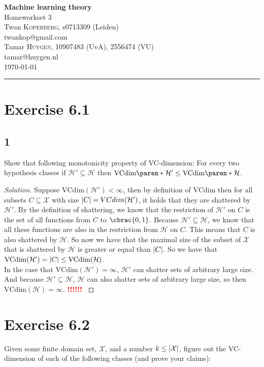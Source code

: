 \documentclass[10pt, a4paper, twoside]{amsart}
\makeatletter
\DeclarePairedDelimiter\abs{\lvert}{\rvert}
\DeclarePairedDelimiter\cbrac\{\}
\DeclarePairedDelimiter\paren()
\newcommand{\cH}{\ensuremath{\mathcal{H}}}
\newcommand{\cX}{\ensuremath{\mathcal{X}}}
\newenvironment{solution}
               {\let\oldqedsymbol=\qedsymbol
                \renewcommand{\qedsymbol}{$\blacktriangleleft$}
                \begin{proof}[Solution]}
               {\end{proof}
                \renewcommand{\qedsymbol}{\oldqedsymbol}}
\newcommand{\TODO}{\textcolor{red}{\textbf{!!!!!! }}}
\newcommand{\firstName}  {Twan}
\newcommand{\lastName}   {Koperberg}
\newcommand{\studId}     {0713309 (Leiden)}
\renewcommand{\email}    {twankop@gmail.com}
\newcommand{\firstNameII}  {Tamar}
\newcommand{\lastNameII}   {Huygen}
\newcommand{\studIdII}     {10907483 (UvA)}
\newcommand{\studIdIII}    {2556474 (VU)}
\newcommand{\emailII}     {tamar@huygen.nl}
\makeatother
\begin{document}
\begin{center}

  {\huge\bf Machine learning theory}\\
  {\large\sc Homeworkset 3 }\\ \vspace{1em}
  \firstName \textsc{ \lastName}, {\sc s}\studId \\
  \email\text{}\\ \smallskip
  \firstNameII \textsc{ \lastNameII}, \studIdII, \studIdIII\\
  \emailII \\ \bigskip
  \today \\\bigskip
  \hrule
  \bigskip
 \end{center}

\section*{Exercise 6.1}
\subsection*{1}
Show that following monotonicity property of VC-dimension: For every two hypothesis classes if $\cH' \subseteq \cH$ then $\text{VCdim}\paren*{\cH'}\leq \text{VCdim}\paren*{\cH}$.
\begin{solution}
  Suppose $\text{VCdim}(\cH') < \infty$, then by definition of $\text{VCdim}$ then for all subsets $C \subseteq \cX$ with size $\abs{C} = VCdim(\cH')$, it holds that they are shattered by $\cH'$. By the definition of shattering, we know that the restriction of $\cH'$ on $C$ is the set of all functions from $C$ to $\cbrac{0,1}$. Because $\cH' \subseteq \cH$, we know that all these functions are also in the restriction from $\cH$ on $C$. This means that $C$ is also shattered by $\cH$. So now we have that the maximal size of the subset of $\cX$ that is shattered by $\cH$ is greater or equal than $\abs{C}$. So we have that $\text{VCdim}(\cH') = \abs{C} \leq \text{VCdim}(\cH)$. \\
  In the case that $\text{VCdim}(\cH') = \infty$, $\cH'$ can shatter sets of arbitrary large size. And because $\cH' \subseteq \cH$, $\cH$ can also shatter sets of arbitrary large size, so then  $\text{VCdim}(\cH ) = \infty$.
 \TODO
\end{solution}
\section*{Exercise 6.2}
Given some finite domain set, $\cX$, and a number $k \leq \abs{\cX}$, figure out the VC-dimension of each of the following classes (and prove your claims):
\end{document}
